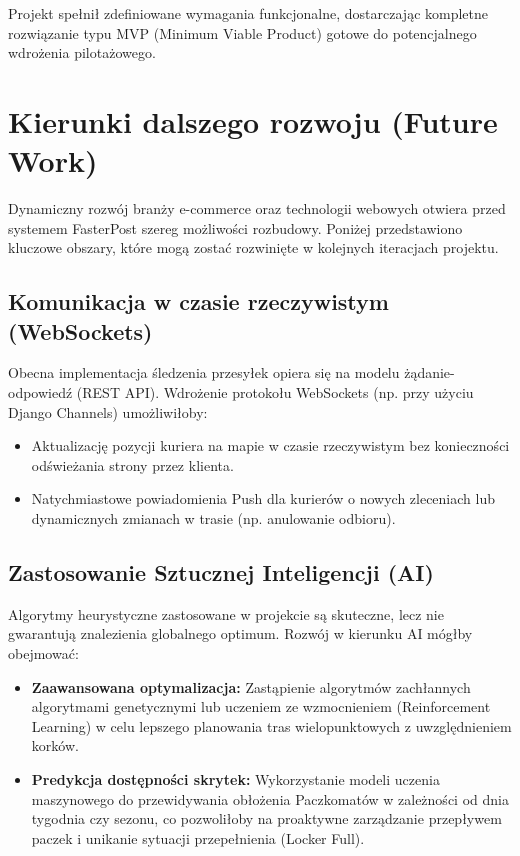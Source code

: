 Projekt spełnił zdefiniowane wymagania funkcjonalne, dostarczając kompletne rozwiązanie typu MVP (Minimum Viable Product) gotowe do potencjalnego wdrożenia pilotażowego.

\section{Kierunki dalszego rozwoju (Future Work)}

Dynamiczny rozwój branży e-commerce oraz technologii webowych otwiera przed systemem FasterPost szereg możliwości rozbudowy. Poniżej przedstawiono kluczowe obszary, które mogą zostać rozwinięte w kolejnych iteracjach projektu.

\subsection{Komunikacja w czasie rzeczywistym (WebSockets)}
Obecna implementacja śledzenia przesyłek opiera się na modelu żądanie-odpowiedź (REST API). Wdrożenie protokołu WebSockets (np. przy użyciu Django Channels) umożliwiłoby:
\begin{itemize}
    \item Aktualizację pozycji kuriera na mapie w czasie rzeczywistym bez konieczności odświeżania strony przez klienta.
    \item Natychmiastowe powiadomienia Push dla kurierów o nowych zleceniach lub dynamicznych zmianach w trasie (np. anulowanie odbioru).
\end{itemize}

\subsection{Zastosowanie Sztucznej Inteligencji (AI)}
Algorytmy heurystyczne zastosowane w projekcie są skuteczne, lecz nie gwarantują znalezienia globalnego optimum. Rozwój w kierunku AI mógłby obejmować:
\begin{itemize}
    \item \textbf{Zaawansowana optymalizacja:} Zastąpienie algorytmów zachłannych algorytmami genetycznymi lub uczeniem ze wzmocnieniem (Reinforcement Learning) w celu lepszego planowania tras wielopunktowych z uwzględnieniem korków.
    \item \textbf{Predykcja dostępności skrytek:} Wykorzystanie modeli uczenia maszynowego do przewidywania obłożenia Paczkomatów w zależności od dnia tygodnia czy sezonu, co pozwoliłoby na proaktywne zarządzanie przepływem paczek i unikanie sytuacji przepełnienia (Locker Full).
\end{itemize}


